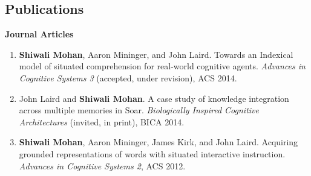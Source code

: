 \documentclass[margin,line,11pt]{res}
\begin{document}
\begin{resume}
\section{\sc Publications}
\textbf{Journal Articles}
\begin{enumerate}[label=\lbrack J\arabic*\rbrack, leftmargin=*]
\item \textbf{Shiwali Mohan}, Aaron Mininger, and John Laird. Towards an Indexical model of situated comprehension for real-world cognitive agents. \emph{Advances in Cognitive Systems 3} (accepted, under revision), ACS 2014.
\item John Laird and \textbf{Shiwali Mohan}. A case study of knowledge integration across multiple memories in Soar. \emph{Biologically Inspired Cognitive Architectures} (invited, in print), BICA 2014.
\item \textbf{Shiwali Mohan}, Aaron Mininger, James Kirk, and John Laird. Acquiring grounded representations of words with situated interactive instruction. \emph{Advances in Cognitive Systems 2}, ACS 2012.
\end{enumerate}


\end{resume}
\end{document}
